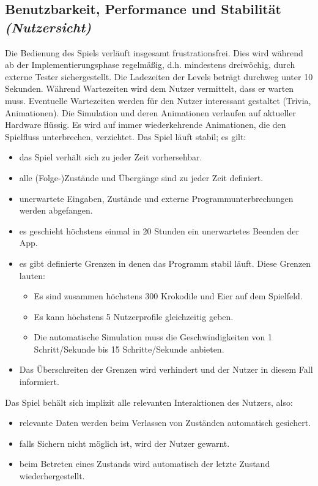 \subsection{Benutzbarkeit, Performance und Stabilität \textit{(Nutzersicht)}}
\begin{requirements}
	 Die Bedienung des Spiels verläuft insgesamt frustrationsfrei. Dies wird während ab der Implementierungsphase regelmäßig, d.h. mindestens dreiwöchig, durch externe Tester sichergestellt.
	 Die Ladezeiten der Levels beträgt durchweg unter 10 Sekunden.
	 Während Wartezeiten wird dem Nutzer vermittelt, dass er warten muss.
	 Eventuelle Wartezeiten werden für den Nutzer interessant gestaltet (Trivia, Animationen).
	 Die Simulation und deren Animationen verlaufen auf aktueller Hardware flüssig.
	 Es wird auf immer wiederkehrende Animationen, die den Spielfluss unterbrechen, verzichtet.
	 Das Spiel läuft stabil; es gilt:
		\begin{itemize}
			\item das Spiel verhält sich zu jeder Zeit vorhersehbar.
			\item alle (Folge-)Zustände und Übergänge sind zu jeder Zeit definiert.
			\item unerwartete Eingaben, Zustände und externe Programmunterbrechungen werden abgefangen.
			\item es geschieht höchstens einmal in 20 Stunden ein unerwartetes Beenden der App.
			\item es gibt definierte Grenzen in denen das Programm stabil läuft. Diese Grenzen lauten:
				\begin{itemize}
					\item Es sind zusammen höchstens 300 Krokodile und Eier auf dem Spielfeld.
					\item Es kann höchstens 5 Nutzerprofile gleichzeitig geben.
					\item Die automatische Simulation muss die Geschwindigkeiten von 1 Schritt/Sekunde bis 15 Schritte/Sekunde anbieten.
				\end{itemize}
			\item Das Überschreiten der Grenzen wird verhindert und der Nutzer in diesem Fall informiert.
		\end{itemize}
	 Das Spiel behält sich implizit alle relevanten Interaktionen des Nutzers, also:
		\begin{itemize}
			\item relevante Daten werden beim Verlassen von Zuständen automatisch gesichert.
			\item falls Sichern nicht möglich ist, wird der Nutzer gewarnt.
			\item beim Betreten eines Zustands wird automatisch der letzte Zustand wiederhergestellt.
		\end{itemize}
\end{requirements}

